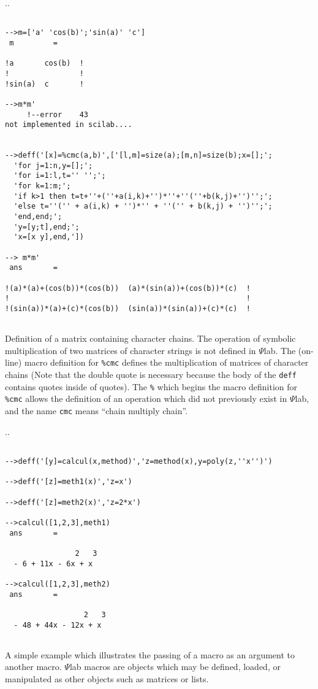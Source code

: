 \noindent.\dotfill.
\begin{verbatim}
 
-->m=['a' 'cos(b)';'sin(a)' 'c']
 m         =
 
!a       cos(b)  !
!                !
!sin(a)  c       !
 
-->m*m'
     !--error    43 
not implemented in scilab....
 
 
-->deff('[x]=%cmc(a,b)',['[l,m]=size(a);[m,n]=size(b);x=[];';
  'for j=1:n,y=[];';
  'for i=1:l,t='' '';';
  'for k=1:m;';
  'if k>1 then t=t+''+(''+a(i,k)+'')*''+''(''+b(k,j)+'')'';';
  'else t=''('' + a(i,k) + '')*'' + ''('' + b(k,j) + '')'';';
  'end,end;';
  'y=[y;t],end;';
  'x=[x y],end,'])
 
--> m*m'
 ans       =
 
!(a)*(a)+(cos(b))*(cos(b))  (a)*(sin(a))+(cos(b))*(c)  !
!                                                      !
!(sin(a))*(a)+(c)*(cos(b))  (sin(a))*(sin(a))+(c)*(c)  !
 
\end{verbatim}
Definition of a matrix containing character chains. The 
operation of symbolic multiplication of two matrices of character
strings is not defined in $\Psi$lab.  The (on-line)
macro definition for {\tt \%cmc} defines the multiplication of 
matrices of character chains (Note that the double quote is necessary
because the body of the {\tt deff} contains quotes inside of quotes).
The {\tt \%} which begins the macro definition for {\tt \%cmc}
allows the definition of an operation which did not previously 
exist in $\Psi$lab, and the name {\tt cmc} means ``chain multiply chain''.

\noindent.\dotfill.
\begin{verbatim}
 
-->deff('[y]=calcul(x,method)','z=method(x),y=poly(z,''x'')')
 
-->deff('[z]=meth1(x)','z=x')
 
-->deff('[z]=meth2(x)','z=2*x')
 
-->calcul([1,2,3],meth1)
 ans       =
 
                2   3  
  - 6 + 11x - 6x + x   
 
-->calcul([1,2,3],meth2)
 ans       =
 
                  2   3  
  - 48 + 44x - 12x + x   
 
\end{verbatim}
A simple example which illustrates the passing of a macro as an argument
to another macro. $\Psi$lab macros are objects which may be defined, loaded,
or manipulated as other objects such as matrices or lists.

